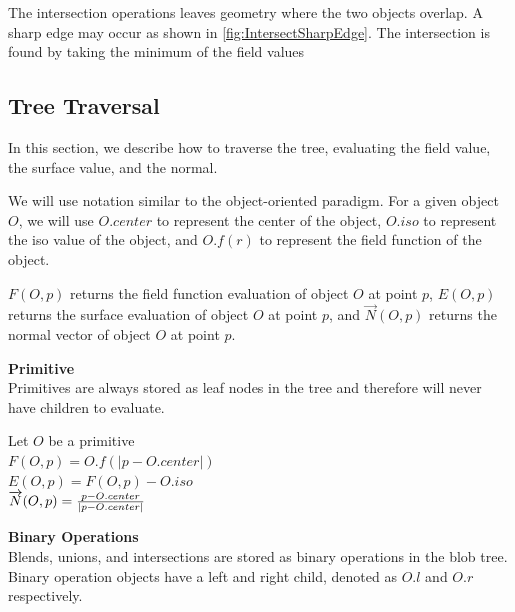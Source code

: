 \documentclass[conference]{acmsiggraph}
\begin{document}
The intersection operations leaves geometry where the two objects overlap. A
sharp edge may occur as shown in \ref{fig:IntersectSharpEdge}. The intersection
is found by taking the minimum of the field values





\subsection{Tree Traversal\label{subsec:Tree Traversal}}
In this section, we describe how to traverse the tree, evaluating the field
value, the surface value, and the normal.

We will use notation similar to the object-oriented paradigm. For a given
object $O$, we will use $O.center$ to represent the center of the object,
$O.iso$ to represent the iso value of the object, and $O.f(r)$ to represent the
field function of the object.

$F(O, p)$ returns the
field function evaluation of object $O$ at point $p$, $E(O, p)$ returns the
surface evaluation of object $O$ at point $p$, and $\overrightarrow{N}(O, p)$
returns the normal vector of object $O$ at point $p$.

\textbf{Primitive}\\
Primitives are always stored as leaf nodes in the tree and therefore will never
have children to evaluate.

Let $O$ be a primitive\\
$F(O, p) = O.f(\lvert p - O.center \rvert)$\\
$E(O, p) = F(O, p) - O.iso$\\
$\overrightarrow{N}(O, p) = {p - O.center \over \lvert p -
O.center \rvert}$


\textbf{Binary Operations}\\
Blends, unions, and intersections are stored as binary operations in the
blob tree. Binary operation objects have a left and right child, denoted as
$O.l$ and $O.r$ respectively.
\end{document}
